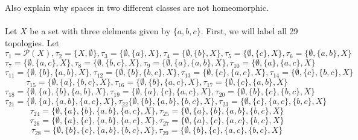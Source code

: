 \documentclass[12pt]{article}
\begin{document}
\begin{enumerate}
Also explain why spaces in two different classes are not homeomorphic.\\\\
Let $X$ be a set with three elelments given by $\{a,b,c\}$. First, we will label all 29 topologies. Let $$\tau_1=\mathcal{P}(X), \tau_2=\{X,\emptyset\}, \tau_3=\{\emptyset, \{a\}, X\}, \tau_4=\{\emptyset, \{b\}, X\}, \tau_5=\{\emptyset, \{c\}, X\}, \tau_6=\{\emptyset, \{a,b\}, X\}$$ $$\tau_7=\{\emptyset, \{a,c\}, X\}, \tau_8=\{\emptyset, \{b,c\}, X\}, \tau_9=\{\emptyset, \{a\}, \{a,b\}, X\}, \tau_{10}=\{\emptyset, \{a\}, \{a,c\}, X\}$$ $$\tau_{11}=\{\emptyset, \{b\}, \{a,b\}, X\}, \tau_{12}=\{\emptyset, \{b\}, \{b,c\}, X\}, \tau_{13}=\{\emptyset, \{c\}, \{a,c\}, X\}, \tau_{14}=\{\emptyset, \{c\}, \{b,c\}, X\}$$ $$\tau_{15}=\{\emptyset, \{a\}, \{b,c\}, X\}, \tau_{16}=\{\emptyset, \{b\}, \{a,c\}, X\}, \tau_{17}=\{\emptyset, \{c\}, \{a,b\}, X\}$$ $$\tau_{18}=\{\emptyset, \{a\}, \{b\}, \{a,b\}, X\}, \tau_{19}=\{\emptyset, \{a\}, \{c\}, \{a,c\}, X\}, \tau_{20}=\{\emptyset, \{b\}, \{c\}, \{b,c\}, X\}$$ $$\tau_{21}=\{\emptyset, \{a\}, \{a,b\}, \{a,c\}, X\}, \tau_{22}\{\emptyset, \{b\}, \{a,b\}, \{b,c\}, X\}, \tau_{23}=\{\emptyset, \{c\}, \{a,c\}, \{b,c\}, X\}$$ $$\tau_{24}=\{\emptyset, \{a\}, \{b\}, \{a,b\}, \{a,c\}, X\}, \tau_{25}=\{\emptyset, \{a\}, \{b\}, \{a,b\}, \{b,c\}, X\}$$ $$\tau_{26}=\{\emptyset, \{a\}, \{c\}, \{a,b\}, \{a,c\}, X\}, \tau_{27}=\{\emptyset, \{a\}, \{c\}, \{a,c\}, \{b,c\}, X\}$$ $$\tau_{28}=\{\emptyset, \{b\}, \{c\}, \{a,b\}, \{b,c\}, X\}, \tau_{29}=\{\emptyset, \{b\}, \{c\}, \{a,c\}, \{b,c\}, X\}$$\\


\end{enumerate}
\end{document}
